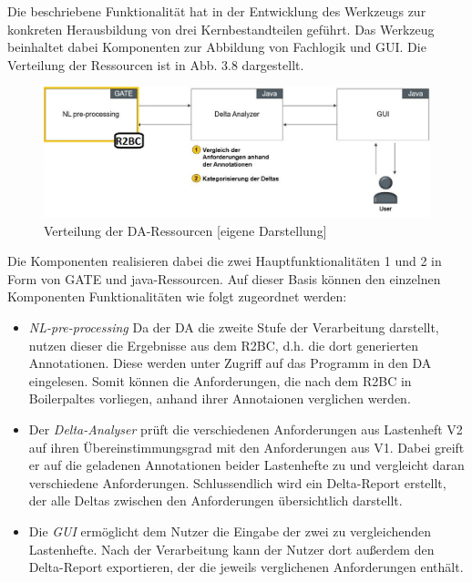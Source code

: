 \documentclass[12pt]{report}
\begin{document}
Die beschriebene Funktionalität hat in der Entwicklung des Werkzeugs zur konkreten Herausbildung von drei Kernbestandteilen geführt. Das Werkzeug beinhaltet dabei Komponenten zur Abbildung von Fachlogik und GUI. Die Verteilung der Ressourcen ist in Abb. 3.8 dargestellt.
 
\begin{figure}[h!]
\begin{center}
\includegraphics[scale=0.55]{Bilder/Verteilung-DA.jpg}
\caption{Verteilung der DA-Ressourcen [eigene Darstellung]}
\end{center}
\end{figure}

Die Komponenten realisieren dabei die zwei Hauptfunktionalitäten 1 und 2 in Form von GATE und java-Ressourcen. Auf dieser Basis können den einzelnen Komponenten Funktionalitäten wie folgt zugeordnet werden:
\begin{itemize}
\item \textit{NL-pre-processing} Da der DA die zweite Stufe der Verarbeitung darstellt, nutzen dieser die Ergebnisse aus dem R2BC, d.h. die dort generierten Annotationen. Diese werden unter Zugriff auf das Programm in den DA eingelesen. Somit können die Anforderungen, die nach dem R2BC in Boilerpaltes vorliegen, anhand ihrer Annotaionen verglichen werden.
\item Der \textit{Delta-Analyser} prüft die verschiedenen Anforderungen aus Lastenheft V2 auf ihren Übereinstimmungsgrad mit den Anforderungen aus V1. Dabei greift er auf die geladenen Annotationen beider Lastenhefte zu und vergleicht daran verschiedene Anforderungen. Schlussendlich wird ein Delta-Report erstellt, der alle Deltas zwischen den Anforderungen übersichtlich darstellt.
\item Die \textit{GUI} ermöglicht dem Nutzer die Eingabe der zwei zu vergleichenden Lastenhefte. Nach der Verarbeitung kann der Nutzer dort außerdem den Delta-Report exportieren, der die jeweils verglichenen Anforderungen enthält.
\end{itemize}
\end{document}
